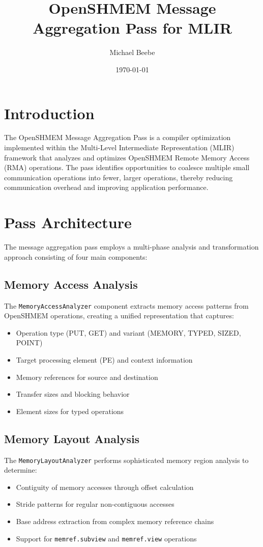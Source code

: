 \documentclass{article}
\title{OpenSHMEM Message Aggregation Pass for MLIR}
\author{Michael Beebe}
\date{\today}
\begin{document}
\maketitle

\section{Introduction}

The OpenSHMEM Message Aggregation Pass is a compiler optimization implemented within the Multi-Level Intermediate Representation (MLIR) framework that analyzes and optimizes OpenSHMEM Remote Memory Access (RMA) operations. The pass identifies opportunities to coalesce multiple small communication operations into fewer, larger operations, thereby reducing communication overhead and improving application performance.

\section{Pass Architecture}

The message aggregation pass employs a multi-phase analysis and transformation approach consisting of four main components:

\subsection{Memory Access Analysis}
The \texttt{MemoryAccessAnalyzer} component extracts memory access patterns from OpenSHMEM operations, creating a unified representation that captures:
\begin{itemize}
\item Operation type (PUT, GET) and variant (MEMORY, TYPED, SIZED, POINT)
\item Target processing element (PE) and context information
\item Memory references for source and destination
\item Transfer sizes and blocking behavior
\item Element sizes for typed operations
\end{itemize}

\subsection{Memory Layout Analysis}
The \texttt{MemoryLayoutAnalyzer} performs sophisticated memory region analysis to determine:
\begin{itemize}
\item Contiguity of memory accesses through offset calculation
\item Stride patterns for regular non-contiguous accesses
\item Base address extraction from complex memory reference chains
\item Support for \texttt{memref.subview} and \texttt{memref.view} operations
\end{itemize}
\end{document}
